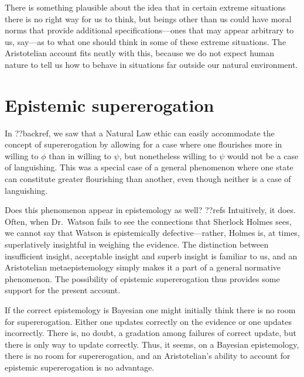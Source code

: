 There is something plausible about the idea that in certain extreme situations there is no right way for us to think,
but beings other than us could have moral norms that provide additional specifications---ones that may appear 
arbitrary to us, say---as to what one should think in some of these extreme situations. The Aristotelian account
fits neatly with this, because we do not expect human nature to tell us how to behave in situations far outside
our natural environment.

\section{Epistemic supererogation}
In ??backref, we saw that a Natural Law ethic can easily accommodate the concept of supererogation by allowing for a case
where one flourishes more in willing to $\phi$ than in willing to $\psi$, but nonetheless willing to $\psi$ would not be a case of languishing. This was
a special case of a general phenomenon where one state can constitute greater flourishing than another, even though neither
is a case of languishing. 

Does this phenomenon appear in epistemology as well? ??refs  Intuitively, it does. Often, when Dr.~Watson fails to see the 
connections that Sherlock Holmes sees, we cannot say that Watson is epistemically defective---rather, Holmes is, at times, 
superlatively insightful in weighing the evidence. The distinction between
insufficient insight, acceptable insight and superb insight is familiar to us, and an Aristotelian metaepistemology simply
makes it a part of a general normative phenomenon. The possibility of epistemic supererogation thus provides some support for the 
present account.

If the correct epistemology is Bayesian one might initially think there is no room for supererogation. Either one updates
correctly on the evidence or one updates incorrectly. There is, no doubt, a gradation among failures of correct update, 
but there is only way to update correctly.  Thus, it seems, on a Bayesian epistemology, there is no room for supererogation,
and an Aristotelian's ability to account for epistemic supererogation is no advantage.

